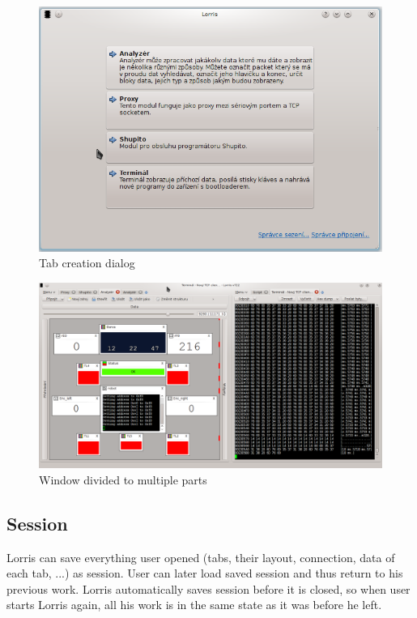 \documentclass[12pt, a4paper, oneside]{article}
\begin{document}
\begin{figure}[H]
\begin{center}
\includegraphics[scale=0.6]{img/new_tab.png}
\caption{Tab creation dialog}
\end{center}
\end{figure}

\begin{figure}[H]
\begin{center}
\includegraphics[width=\textwidth]{img/split.png}
\caption{Window divided to multiple parts}
\label{split_img}
\end{center}
\end{figure}

\subsection{Session}
Lorris can save everything user opened (tabs, their layout, connection, data of each tab, ...) as session. User can later load saved session and thus return to his previous work. Lorris automatically saves session before it is closed, so when user starts Lorris again, all his work is in the same state as it was before he left.
\end{document}
